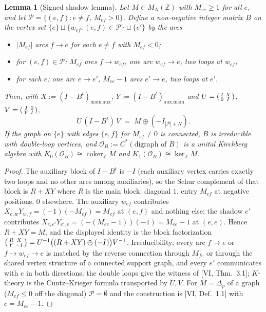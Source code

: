 \documentclass[11pt]{amsart}
\numberwithin{equation}{section}
\newtheorem{lemma}[theorem]{Lemma}
\theoremstyle{definition}
\theoremstyle{remark}
\newcommand{\Z}{\mathbb{Z}}
\newcommand{\cO}{\mathcal{O}}
\newcommand{\coker}{\operatorname{coker}}
\begin{document}
\begin{lemma}[Signed shadow lemma]\label{lem:signed}
Let $M\in M_N(\Z)$ with $M_{ee}\ge1$ for all $e$, and let $\mathcal P=\{(e,f):e\neq f,\
M_{ef}>0\}$. Define a non-negative integer matrix $B$ on the vertex set
$\{e\}\sqcup\{w_{ef}:(e,f)\in\mathcal P\}\sqcup\{e'\}$ by the arcs
\begin{itemize}
\item $|M_{ef}|$ arcs $f\to e$ for each $e\neq f$ with $M_{ef}<0$;
\item for $(e,f)\in\mathcal P$: $M_{ef}$ arcs $f\to w_{ef}$, one arc $w_{ef}\to e$, two loops at
$w_{ef}$;
\item for each $e$: one arc $e\to e'$, $M_{ee}-1$ arcs $e'\to e$, two loops at $e'$.
\end{itemize}
Then, with $X:=(I-B^{t})_{\text{main},\text{aux}}$, $Y:=(I-B^{t})_{\text{aux},\text{main}}$
and $U=\begin{psmallmatrix}I&X\\0&I\end{psmallmatrix}$,
$V=\begin{psmallmatrix}I&0\\Y&I\end{psmallmatrix}$,
\[
U\,(I-B^{t})\,V\;=\;M\oplus(-I_{|\mathcal P|+N}) .
\]
If the graph on $\{e\}$ with edges $\{e,f\}$ for $M_{ef}\neq0$ is connected, $B$ is
irreducible with double-loop vertices, and $\cO_B:=C^*(\text{digraph of }B)$ is a unital
Kirchberg algebra with $K_0(\cO_B)\cong\coker_\Z M$ and $K_1(\cO_B)\cong\ker_\Z M$.
\end{lemma}

\begin{proof}
The auxiliary block of $I-B^{t}$ is $-I$ (each auxiliary vertex carries exactly two loops and
no other arcs among auxiliaries), so the Schur complement of that block is $R+XY$ where
$R$ is the main block: diagonal $1$, entry $M_{ef}$ at negative positions, $0$ elsewhere.
The auxiliary $w_{ef}$ contributes $X_{e,w}Y_{w,f}=(-1)(-M_{ef})=M_{ef}$ at $(e,f)$ and
nothing else; the shadow $e'$ contributes $X_{e,e'}Y_{e',e}=(-(M_{ee}-1))(-1)=M_{ee}-1$ at
$(e,e)$. Hence $R+XY=M$, and the displayed identity is the block factorization
$\begin{psmallmatrix}R&X\\Y&-I\end{psmallmatrix}=U^{-1}\bigl((R+XY)\oplus(-I)\bigr)V^{-1}$.
Irreducibility: every arc $f\to e$ or $f\to w_{ef}\to e$ is matched by the reverse
connection through $M_{fe}$ or through the shared vertex structure of a connected support
graph, and every $e'$ communicates with $e$ in both directions; the double loops give the
witness of [VI, Thm.~3.1]; $K$-theory is the Cuntz--Krieger formula transported by $U,V$.
For $M=\Delta_p$ of a graph ($M_{ef}\le0$ off the diagonal) $\mathcal P=\emptyset$ and the
construction is [VI, Def.~1.1] with $c=M_{ee}-1$.
\end{proof}
\end{document}
